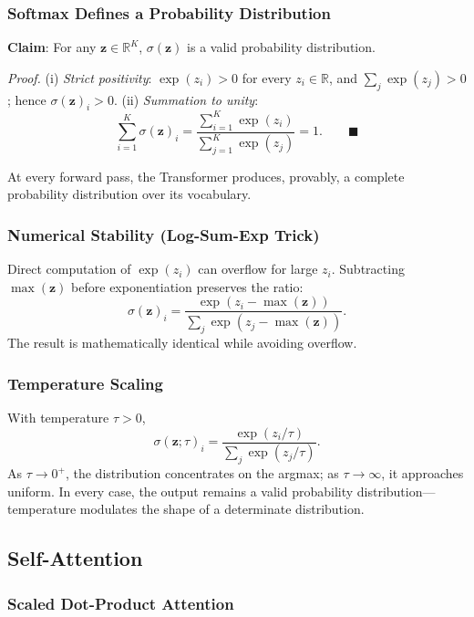 \documentclass[a4paper,twocolumn,11pt]{article}
\begin{document}
\subsubsection*{Softmax Defines a Probability Distribution}

\textbf{Claim}: For any $\mathbf{z} \in \mathbb{R}^K$, $\sigma(\mathbf{z})$ is a valid probability distribution.

\textit{Proof.}
(i) \emph{Strict positivity}: $\exp(z_i) > 0$ for every $z_i \in \mathbb{R}$, and $\sum_j \exp(z_j) > 0$; hence $\sigma(\mathbf{z})_i > 0$.
(ii) \emph{Summation to unity}:
\[
\sum_{i=1}^{K} \sigma(\mathbf{z})_i = \frac{\sum_{i=1}^{K} \exp(z_i)}{\sum_{j=1}^{K} \exp(z_j)} = 1. \qquad \blacksquare
\]

At every forward pass, the Transformer produces, provably, a complete probability distribution over its vocabulary.

\subsubsection*{Numerical Stability (Log-Sum-Exp Trick)}

Direct computation of $\exp(z_i)$ can overflow for large $z_i$. Subtracting $\max(\mathbf{z})$ before exponentiation preserves the ratio:
\[
\sigma(\mathbf{z})_i = \frac{\exp(z_i - \max(\mathbf{z}))}{\sum_j \exp(z_j - \max(\mathbf{z}))}.
\]
The result is mathematically identical while avoiding overflow.

\subsubsection*{Temperature Scaling}

With temperature $\tau > 0$,
\[
\sigma(\mathbf{z}; \tau)_i = \frac{\exp(z_i/\tau)}{\sum_j \exp(z_j/\tau)}.
\]
As $\tau \to 0^+$, the distribution concentrates on the argmax; as $\tau \to \infty$, it approaches uniform. In every case, the output remains a valid probability distribution---temperature modulates the shape of a determinate distribution.

\subsection{Self-Attention}
\label{sec:A4}

\subsubsection*{Scaled Dot-Product Attention}
\end{document}
